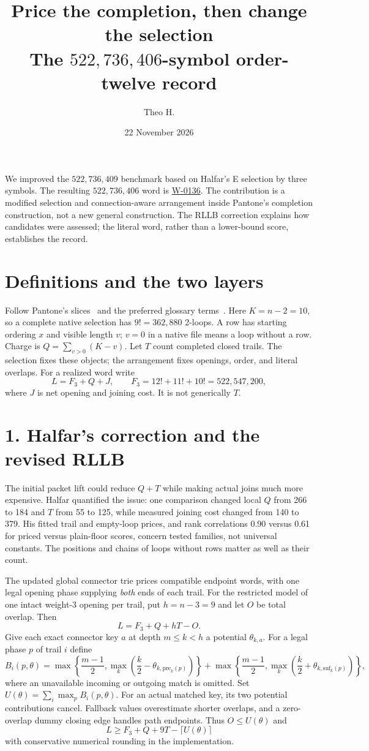 \documentclass[11pt]{article}
\title{\vspace{-1.5em}Price the completion, then change the selection\\
\large The $522{,}736{,}406$-symbol order-twelve record}
\author{Theo H.}
\date{22 November 2026}
\begin{document}
\maketitle
\vspace{-1.5em}
We improved the $522{,}736{,}409$ benchmark based on Halfar's E selection
by three symbols. The resulting $522{,}736{,}406$ word is
\href{https://superpermutations.com/w/W-0136}{W-0136}.
The contribution is a modified selection and connection-aware arrangement
inside Pantone's completion construction, not a new general construction.
The RLLB correction explains how candidates were assessed; the literal
word, rather than a lower-bound score, establishes the record.

\section*{Definitions and the two layers}
Follow Pantone's slices~\cite{pantone} and the preferred glossary
terms~\cite{glossary}. Here $K=n-2=10$, so a complete native selection has
$9!=362{,}880$ 2-loops. A row has starting ordering $x$ and visible length
$v$; $v=0$ in a native file means a loop without a row. Charge is
$Q=\sum_{v>0}(K-v)$. Let $T$ count completed closed trails.
The selection fixes these objects; the arrangement fixes openings, order,
and literal overlaps. For a realized word write
\[
L=F_3+Q+J,\qquad F_3=12!+11!+10!=522{,}547{,}200,
\]
where $J$ is net opening and joining cost. It is not generically $T$.

\section*{1. Halfar's correction and the revised RLLB}
The initial packet lift could reduce $Q+T$ while making actual joins much
more expensive. Halfar quantified the issue: one
comparison changed local $Q$ from 266 to 184 and $T$ from 55 to 125,
while measured joining cost changed from 140 to 379. His fitted trail and
empty-loop prices, and rank correlations 0.90 versus 0.61 for priced
versus plain-floor scores, concern tested families, not universal constants.
The positions and chains of loops without rows matter as well as their count.

The updated global connector trie prices compatible endpoint words, with
one legal opening phase supplying \emph{both} ends of each trail.
For the restricted model of one intact weight-3 opening per trail,
put $h=n-3=9$ and let $O$ be total overlap. Then
\[
L=F_3+Q+hT-O.
\]
Give each exact connector key $a$ at depth $m\leq k<h$ a potential
$\theta_{k,a}$. For a legal phase $p$ of trail $i$ define
\[
B_i(p,\theta)=
\max\!\left\{\frac{m-1}{2},\max_k\left(\frac{k}{2}-\theta_{k,\mathrm{pre}_k(p)}\right)\right\}
+\max\!\left\{\frac{m-1}{2},\max_k\left(\frac{k}{2}+\theta_{k,\mathrm{suf}_k(p)}\right)\right\},
\]
where an unavailable incoming or outgoing match is omitted. Set
$U(\theta)=\sum_i\max_p B_i(p,\theta)$.
For an actual matched key, its two potential contributions cancel.
Fallback values overestimate shorter overlaps, and a zero-overlap dummy
closing edge handles path endpoints. Thus $O\leq U(\theta)$ and
\[
L\geq F_3+Q+9T-\lceil U(\theta)\rceil
\]
with conservative numerical rounding in the implementation.
\end{document}
